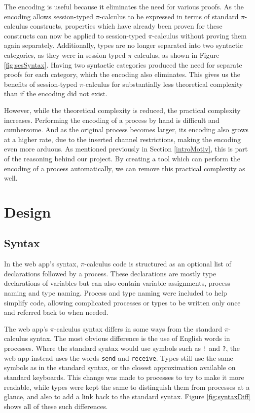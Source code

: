 \documentclass{l4proj}
\begin{document}
\quad The encoding is useful because it eliminates the need for various proofs. As the encoding allows session-typed $\pi$-calculus to be expressed in terms of standard $\pi$-calculus constructs, properties which have already been proven for these constructs can now be applied to session-typed $\pi$-calculus without proving them again separately. Additionally, types are no longer separated into two syntactic categories, as they were in session-typed $\pi$-calculus, as shown in Figure \ref{fig:sesSyntax}. Having two syntactic categories produced the need for separate proofs for each category, which the encoding also eliminates. This gives us the benefits of session-typed $\pi$-calculus for substantially less theoretical complexity than if the encoding did not exist.

\quad However, while the theoretical complexity is reduced, the practical complexity increases. Performing the encoding of a process by hand is difficult and cumbersome. And as the original process becomes larger, its encoding also grows at a higher rate, due to the inserted channel restrictions, making the encoding even more arduous. As mentioned previously in Section \ref{introMotiv}, this is part of the reasoning behind our project. By creating a tool which can perform the encoding of a process automatically, we can remove this practical complexity as well.

\chapter{Design}
\label{design}

\section{Syntax}
\label{dsnSyntax}

\quad In the web app's syntax, $\pi$-calculus code is structured as an optional list of declarations followed by a process. These declarations are mostly type declarations of variables but can also contain variable assignments, process naming and type naming. Process and type naming were included to help simplify code, allowing complicated processes or types to be written only once and referred back to when needed.

\quad The web app's $\pi$-calculus syntax differs in some ways from the standard $\pi$-calculus syntax. The most obvious difference is the use of English words in processes. Where the standard syntax would use symbols such as \texttt{!} and \texttt{?}, the web app instead uses the words \texttt{send} and \texttt{receive}. Types still use the same symbols as in the standard syntax, or the closest approximation available on standard keyboards. This change was made to processes to try to make it more readable, while types were kept the same to distinguish them from processes at a glance, and also to add a link back to the standard syntax. Figure \ref{fig:syntaxDiff} shows all of these such differences.
\end{document}
